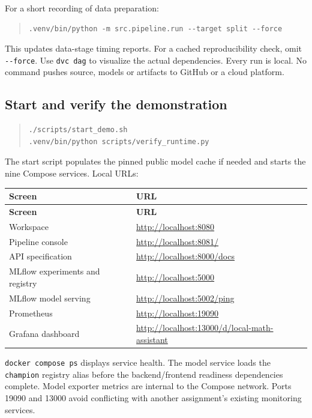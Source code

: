 \documentclass[11pt,a4paper]{article}
\begin{document}
For a short recording of data preparation:

\begin{quote}\small
\begin{verbatim}
.venv/bin/python -m src.pipeline.run --target split --force
\end{verbatim}
\end{quote}
This updates data-stage timing reports. For a cached reproducibility check, omit \texttt{-\allowbreak{}-\allowbreak{}force}. Use \texttt{dvc dag} to visualize the actual dependencies. Every run is local. No command pushes source, models or artifacts to GitHub or a cloud platform.

\subsection*{Start and verify the demonstration}
\begin{quote}\small
\begin{verbatim}
./scripts/start_demo.sh
.venv/bin/python scripts/verify_runtime.py
\end{verbatim}
\end{quote}
The start script populates the pinned public model cache if needed and starts the nine Compose services. Local URLs:

\begingroup\small
\begin{longtable}{@{}>{\raggedright\arraybackslash}p{0.5000\dimexpr\textwidth-12pt\relax}>{\raggedright\arraybackslash}p{0.5000\dimexpr\textwidth-12pt\relax}@{}}
\toprule
\textbf{Screen} & \textbf{URL} \\
\midrule
\endfirsthead
\textbf{Screen} & \textbf{URL} \\
\midrule
\endhead
Workspace & \url{http://localhost:8080} \\
Pipeline console & \url{http://localhost:8081/} \\
API specification & \url{http://localhost:8000/docs} \\
MLflow experiments and registry & \url{http://localhost:5000} \\
MLflow model serving & \url{http://localhost:5002/ping} \\
Prometheus & \url{http://localhost:19090} \\
Grafana dashboard & \url{http://localhost:13000/d/local-math-assistant} \\
\bottomrule
\end{longtable}
\endgroup
\texttt{docker compose ps} displays service health. The model service loads the \texttt{champion} registry alias before the backend/frontend readiness dependencies complete. Model exporter metrics are internal to the Compose network. Ports 19090 and 13000 avoid conflicting with another assignment's existing monitoring services.
\end{document}
